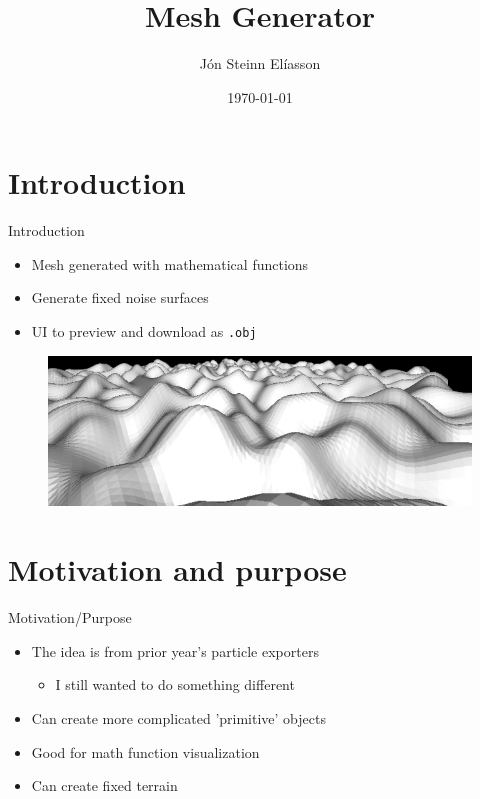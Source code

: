\documentclass{beamer}
\title[Game Engine Architecture]{Mesh Generator}
\author{Jón Steinn Elíasson}
\institute{Reykjavík University}
\date{\today}
\begin{document}
\begin{frame}
  \titlepage
\end{frame}

\section{Introduction}
\begin{frame}{Introduction}
\begin{itemize}
\item Mesh generated with mathematical functions
\item Generate fixed noise surfaces
\item UI to preview and download as \texttt{.obj}
\end{itemize}
\begin{figure}
\includegraphics[scale=0.5]{terrain.png}
\end{figure}
\end{frame}

\section{Motivation and purpose}
\begin{frame}{Motivation/Purpose}
\begin{itemize}
\item The idea is from prior year's particle exporters
\begin{itemize}
\item I still wanted to do something different
\end{itemize}
\item Can create more complicated 'primitive' objects
\item Good for math function visualization
\item Can create fixed terrain
\end{itemize}
\end{frame}
\end{document}
